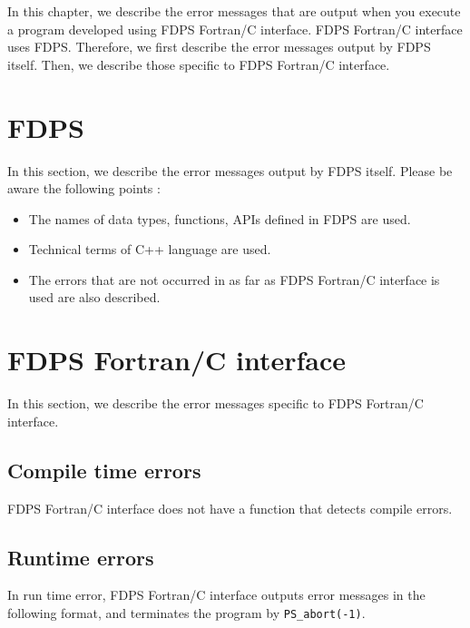 In this chapter, we describe the error messages that are output when you execute a program developed using FDPS Fortran/C interface. FDPS Fortran/C interface uses FDPS. Therefore, we first describe the error messages output by FDPS itself. Then, we describe those specific to FDPS Fortran/C interface.

\section{FDPS}
\label{sec:err_msg:FDPS}
In this section, we describe the error messages output by FDPS itself. Please be aware the following points :
\begin{itemize}[leftmargin=*,itemsep=-1ex]
\item The names of data types, functions, APIs defined in FDPS are used.
\item Technical terms of C++ language are used.
\item The errors that are not occurred in as far as FDPS Fortran/C interface is used are also described.
\end{itemize}



\section{FDPS Fortran/C interface}
\label{sec:err_msg:FDPS_ftn_if}
In this section, we describe the error messages specific to FDPS Fortran/C interface.

\subsection{Compile time errors}
FDPS Fortran/C interface does not have a function that detects compile errors.

\subsection{Runtime errors}
In run time error, FDPS Fortran/C interface outputs error messages in the following format, and terminates the program by \texttt{PS\_abort(-1)}.

